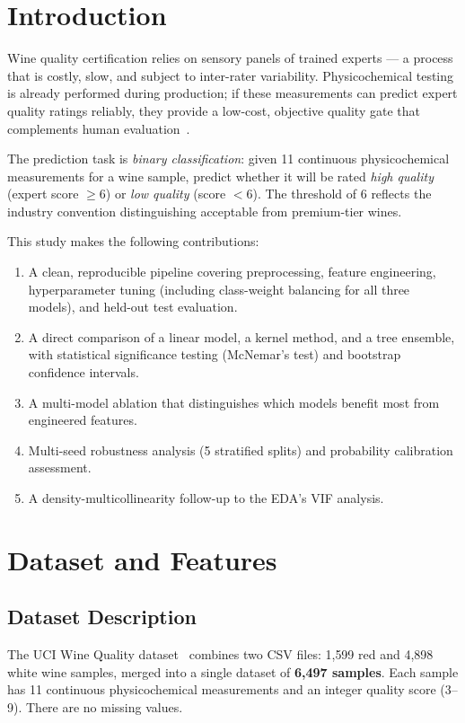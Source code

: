 \documentclass[conference]{IEEEtran}
\begin{document}
\section{Introduction}

Wine quality certification relies on sensory panels of trained experts
--- a process that is costly, slow, and subject to inter-rater
variability. Physicochemical testing is already performed during
production; if these measurements can predict expert quality ratings
reliably, they provide a low-cost, objective quality gate that
complements human evaluation~\cite{cortez2009}.

The prediction task is \emph{binary classification}: given 11 continuous
physicochemical measurements for a wine sample, predict whether it will
be rated \emph{high quality} (expert score $\ge 6$) or \emph{low
quality} (score $< 6$). The threshold of 6 reflects the industry
convention distinguishing acceptable from premium-tier wines.

This study makes the following contributions:
\begin{enumerate}
\item A clean, reproducible pipeline covering preprocessing, feature
engineering, hyperparameter tuning (including class-weight balancing for
all three models), and held-out test evaluation.
\item A direct comparison of a linear model, a kernel method, and a
tree ensemble, with statistical significance testing (McNemar's test)
and bootstrap confidence intervals.
\item A multi-model ablation that distinguishes which models benefit
most from engineered features.
\item Multi-seed robustness analysis (5 stratified splits) and
probability calibration assessment.
\item A density-multicollinearity follow-up to the EDA's VIF analysis.
\end{enumerate}

\section{Dataset and Features}

\subsection{Dataset Description}

The UCI Wine Quality dataset~\cite{cortez2009} combines two CSV files:
1{,}599 red and 4{,}898 white wine samples, merged into a single dataset
of \textbf{6{,}497 samples}. Each sample has 11 continuous
physicochemical measurements and an integer quality score (3--9). There
are no missing values.
\end{document}
